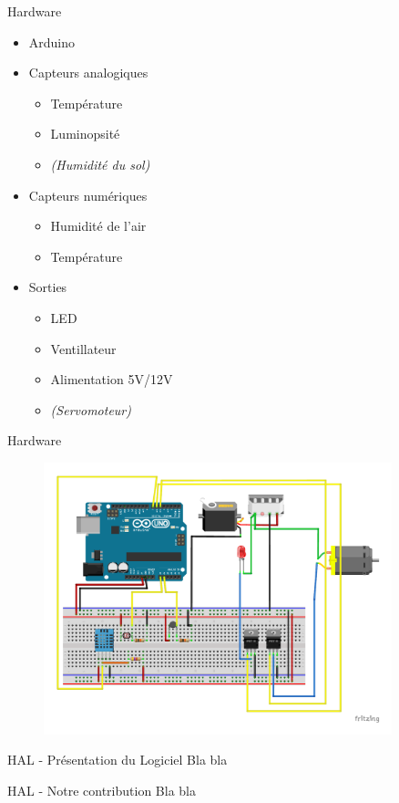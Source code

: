 \documentclass{beamer}
\begin{document}
        \begin{frame}{Hardware}
            \begin{itemize}
                \item Arduino
                \item Capteurs analogiques
                    \begin{itemize}
                        \item Température
                        \item Luminopsité
                        \item \textit{(Humidité du sol)}
                    \end{itemize}
                \item Capteurs numériques
                    \begin{itemize}
                        \item Humidité de l'air
                        \item Température
                    \end{itemize}
                \item Sorties
                    \begin{itemize}
                        \item LED
                        \item Ventillateur
                        \item Alimentation 5V/12V
                        \item \textit{(Servomoteur)}
                    \end{itemize}
            \end{itemize}
        \end{frame}

		\begin{frame}{Hardware}
			\begin{figure}
                \centering
                \includegraphics[width = 0.9\textwidth]{hardware.pdf}
            \end{figure}
		\end{frame}

		\begin{frame}{HAL - Présentation du Logiciel}
			Bla bla
		\end{frame}

		\begin{frame}{HAL - Notre contribution}
			Bla bla
		\end{frame}
\end{document}
